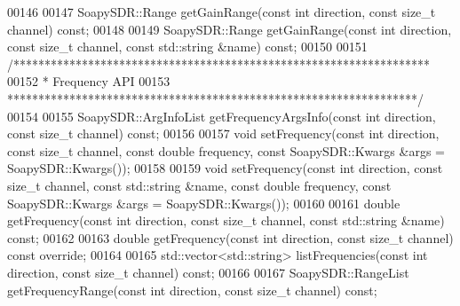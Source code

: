\begin{DoxyCode}
00146 
00147     SoapySDR::Range getGainRange(\textcolor{keyword}{const} \textcolor{keywordtype}{int} direction, \textcolor{keyword}{const} \textcolor{keywordtype}{size\_t} channel) \textcolor{keyword}{const};
00148 
00149     SoapySDR::Range getGainRange(\textcolor{keyword}{const} \textcolor{keywordtype}{int} direction, \textcolor{keyword}{const} \textcolor{keywordtype}{size\_t} channel, \textcolor{keyword}{const} std::string &name) \textcolor{keyword}{const};
00150 
00151     \textcolor{comment}{/*******************************************************************}
00152 \textcolor{comment}{     * Frequency API}
00153 \textcolor{comment}{     ******************************************************************/}
00154 
00155     SoapySDR::ArgInfoList getFrequencyArgsInfo(\textcolor{keyword}{const} \textcolor{keywordtype}{int} direction, \textcolor{keyword}{const} \textcolor{keywordtype}{size\_t} channel) \textcolor{keyword}{const};
00156 
00157     \textcolor{keywordtype}{void} setFrequency(\textcolor{keyword}{const} \textcolor{keywordtype}{int} direction, \textcolor{keyword}{const} \textcolor{keywordtype}{size\_t} channel, \textcolor{keyword}{const} \textcolor{keywordtype}{double} 
      frequency, \textcolor{keyword}{const} SoapySDR::Kwargs &args = SoapySDR::Kwargs());
00158 
00159     \textcolor{keywordtype}{void} setFrequency(\textcolor{keyword}{const} \textcolor{keywordtype}{int} direction, \textcolor{keyword}{const} \textcolor{keywordtype}{size\_t} channel, \textcolor{keyword}{const} std::string &name, \textcolor{keyword}{const} \textcolor{keywordtype}{double} 
      frequency, \textcolor{keyword}{const} SoapySDR::Kwargs &args = SoapySDR::Kwargs());
00160 
00161     \textcolor{keywordtype}{double} getFrequency(\textcolor{keyword}{const} \textcolor{keywordtype}{int} direction, \textcolor{keyword}{const} \textcolor{keywordtype}{size\_t} channel, \textcolor{keyword}{const} std::string &name) \textcolor{keyword}{const};
00162     
00163     \textcolor{keywordtype}{double} getFrequency(\textcolor{keyword}{const} \textcolor{keywordtype}{int} direction, \textcolor{keyword}{const} \textcolor{keywordtype}{size\_t} channel) \textcolor{keyword}{const override};
00164 
00165     std::vector<std::string> listFrequencies(\textcolor{keyword}{const} \textcolor{keywordtype}{int} direction, \textcolor{keyword}{const} \textcolor{keywordtype}{size\_t} channel) \textcolor{keyword}{const};
00166 
00167     SoapySDR::RangeList getFrequencyRange(\textcolor{keyword}{const} \textcolor{keywordtype}{int} direction, \textcolor{keyword}{const} \textcolor{keywordtype}{size\_t} channel) \textcolor{keyword}{const};

\end{DoxyCode}
